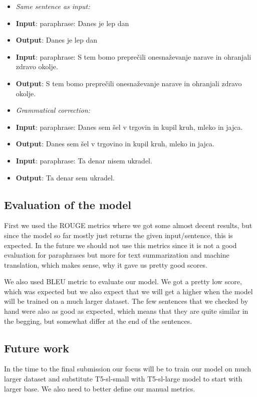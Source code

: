 \documentclass[fleqn,moreauthors,10pt]{ds_report}
\begin{document}
\begin{itemize}
\item \emph{Same sentence as input:}
\item \textbf{Input}: paraphrase: Danes je lep dan 
\item \textbf{Output}: Danes je lep dan
\item \textbf{Input}: paraphrase: S tem bomo preprečili onesnaževanje narave in ohranjali zdravo okolje. 
\item \textbf{Output}: S tem bomo preprečili onesnaževanje narave in ohranjali zdravo okolje.
\item \emph{Grammatical correction:}
\item \textbf{Input}: paraphrase: Danes sem šel v trgovin in kupil kruh, mleko in jajca. 
\item \textbf{Output}: Danes sem šel v trgovino in kupil kruh, mleko in jajca.
\item \textbf{Input}: paraphrase: Ta denar nisem ukradel. 
\item \textbf{Output}: Ta denar sem ukradel.
\end{itemize}


\subsection{Evaluation of the model}

First we used the ROUGE metrics where we got some almost decent results, but since the model so far mostly just returns the given input/sentence, this is expected. In the future we should not use this metrics since it is not a good evaluation for paraphrases but more for text summarization and machine translation, which makes sense, why it gave us pretty good scores.

We also used BLEU metric to evaluate our model. We got a pretty low score, which was expected but we also expect that we will get a higher when the model will be trained on a much larger dataset. The few sentences that we checked by hand were also as good as expected, which means that they are quite similar in the begging, but somewhat differ at the end of the sentences.


\subsection{Future work}
In the time to the final submission our focus will be to train our model on much larger dataset and substitute T5-sl-small with T5-sl-large model to start with larger base. We also need to better define our manual metrics.
\end{document}
